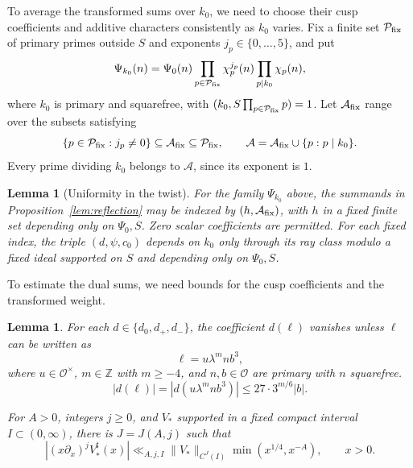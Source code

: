 \documentclass[11pt,a4paper]{article}
\numberwithin{equation}{section}
\numberwithin{figure}{section}
\newtheorem{lemma}[theorem]{Lemma}
\theoremstyle{definition}
\theoremstyle{remark}
\newcommand{\OO}{\mathcal O}
\begin{document}
To average the transformed sums over $k_0$, we need to choose their
cusp coefficients and additive characters consistently as $k_0$ varies.
Fix a finite set $\mathcal P_{\rm fix}$ of primary primes outside $S$
and exponents $j_p\in\{0,\ldots,5\}$, and put
\[
 \Psi_{k_0}(n)=\Psi_0(n)
       \prod_{p\in\mathcal P_{\rm fix}}\chi_p^{j_p}(n)
       \prod_{p\mid k_0}\chi_p(n),
\]
where $k_0$ is primary and squarefree, with
$(k_0,S\prod_{p\in\mathcal P_{\rm fix}}p)=1$.
Let $\mathcal A_{\rm fix}$ range over the subsets satisfying
\[
 \{p\in\mathcal P_{\rm fix}:j_p\ne0\}
       \subseteq\mathcal A_{\rm fix}\subseteq\mathcal P_{\rm fix},
 \qquad
 \mathcal A=\mathcal A_{\rm fix}\cup\{p:p\mid k_0\}.
\]
Every prime dividing $k_0$ belongs to $\mathcal A$, since its exponent is $1$.


\begin{lemma}[Uniformity in the twist]\label{lem:reflection-uniformity}
For the family $\Psi_{k_0}$ above, the summands in
Proposition~\ref{lem:reflection} may be indexed by
$(h,\mathcal A_{\rm fix})$, with $h$ in a fixed finite set depending
only on $\Psi_0,S$. Zero scalar coefficients are permitted.
For each fixed index, the triple $(d,\psi,c_0)$ depends on $k_0$
only through its ray class modulo a fixed ideal supported on $S$
and depending only on $\Psi_0,S$.
\end{lemma}

To estimate the dual sums, we need bounds for the cusp coefficients
and the transformed weight.
\begin{lemma}\label{lem:theta-bounds}
For each $d\in\{d_0,d_+,d_-\}$, the coefficient $d(\ell)$
vanishes unless $\ell$ can be written as
\begin{equation}\label{eq:theta-support}
 \ell=u\lambda^mnb^3,
\end{equation}
where $u\in\OO^\times$, $m\in\mathbb Z$ with $m\ge-4$, and
$n,b\in\OO$ are primary with $n$ squarefree.
\begin{equation}\label{eq:theta-coefficient-bound}
 |d(\ell)|=|d(u\lambda^mnb^3)|\le27\cdot 3^{m/6}|b|.
\end{equation}

For $A>0$, integers $j\ge0$, and $V_*$ supported in a fixed compact
interval $I\subset(0,\infty)$, there is $J=J(A,j)$ such that
\begin{equation}\label{eq:theta-weight-decay}
 |(x\partial_x)^jV_*^\sharp(x)|
 \ll_{A,j,I}\|V_*\|_{C^J(I)}\min(x^{1/4},x^{-A}),\qquad x>0.
\end{equation}
\end{lemma}
\end{document}

